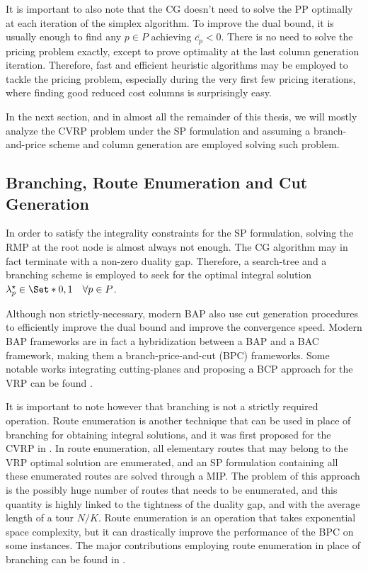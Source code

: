 \medskip

It is important to also note that
the CG doesn't need to solve the PP optimally at each iteration of the simplex algorithm.
To improve the dual bound,
it is usually enough to find any $p \in P$ achieving $\bar{c_p} < 0$.
There is no need to solve the pricing problem exactly,
except to prove optimality at the last column generation iteration.
Therefore, fast and efficient heuristic algorithms may be employed
to tackle the pricing problem,
especially during the very first few pricing iterations,
where finding good reduced cost columns is surprisingly easy.

\medskip

In the next section, and in almost all the remainder of this thesis,
we will mostly analyze the CVRP problem under the SP formulation
and assuming a branch-and-price scheme and column generation
are employed solving such problem.

\subsection{Branching, Route Enumeration and Cut Generation}
\label{sec:intro-branching-and-cut-generation-within-bap-frameworks}

In order to satisfy the integrality constraints for the SP formulation,
solving the RMP at the root node is almost always not enough.
The CG algorithm may in fact terminate with a non-zero duality gap.
Therefore,
a search-tree and a branching scheme is employed
to seek for the optimal integral solution $\lambda^\star_p \in \Set*{0, 1} \quad \forall p \in P$.

Although non strictly-necessary, modern BAP also use
cut generation procedures to efficiently improve the dual bound and improve the convergence speed.
Modern BAP frameworks
are in fact a hybridization between a BAP and a BAC framework,
making them a branch-price-and-cut (BPC) frameworks.
Some notable works integrating cutting-planes and proposing
a BCP approach for the VRP can be found \textcite{fukasawa2006, ropke2012}.

\medskip

It is important to note however that branching is not a strictly required operation.
Route enumeration is another technique that can be used in place of branching
for obtaining integral solutions, and it was first proposed for the CVRP in \textcite{baldacci2008}.
In route enumeration, all elementary routes that may belong to the VRP optimal solution are enumerated,
and an SP formulation containing all these enumerated routes are solved through a MIP.
The problem of this approach is the possibly huge number of routes that needs to be enumerated,
and this quantity is highly linked to the tightness of the duality gap,
and with the average length of a tour $N / K$.
Route enumeration is an operation that takes exponential space complexity,
but it can drastically improve the performance of the BPC on some instances.
The major contributions employing route enumeration in place of branching can be found in
\textcite{baldacci2008, baldacci2011, contardo2014}.

